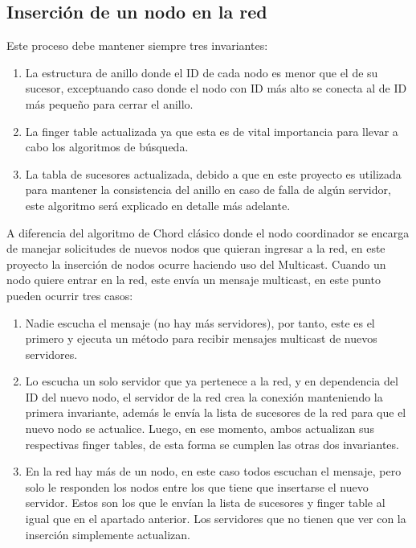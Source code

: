 \documentclass[10pt, a4paper]{article}
\begin{document}
    \subsection{Inserci\'on de un nodo en la red}
    Este proceso debe mantener siempre tres invariantes:
    \begin{enumerate}
    	\item La estructura de anillo donde el ID de cada nodo es menor que el de su sucesor, exceptuando caso donde el nodo con ID más alto se conecta al de ID más pequeño para cerrar el anillo.
    	\item La finger table actualizada ya que esta es de vital importancia para llevar a cabo los algoritmos de búsqueda.
    	\item La tabla de sucesores actualizada, debido a que en este proyecto es utilizada para mantener la consistencia del anillo en caso de falla de algún servidor, este algoritmo será explicado en detalle más adelante.\\
    \end{enumerate}
    A diferencia del algoritmo de Chord clásico donde el nodo coordinador se encarga de manejar solicitudes de nuevos nodos que quieran ingresar a la red, en este proyecto la inserción de nodos ocurre haciendo uso del Multicast. Cuando un nodo quiere entrar en la red, este envía un mensaje multicast, en este punto pueden ocurrir tres casos:
    \begin{enumerate}
    	\item Nadie escucha el mensaje (no hay más servidores), por tanto, este es el primero y ejecuta un método para recibir mensajes multicast de nuevos servidores.
    	\item Lo escucha un solo servidor que ya pertenece a la red, y en dependencia del ID del nuevo nodo, el servidor de la red crea la conexión manteniendo la primera invariante, además le envía la lista de sucesores de la red para que el nuevo nodo se actualice. Luego, en ese momento, ambos actualizan sus respectivas finger tables, de esta forma se cumplen las otras dos invariantes.
    	\item En la red hay más de un nodo, en este caso todos escuchan el mensaje, pero solo le responden los nodos entre los que tiene que insertarse el nuevo servidor. Estos son los que le envían la lista de sucesores y finger table al igual que en el apartado anterior. Los servidores que no tienen que ver con la inserción simplemente actualizan.\\
    \end{enumerate}
    
\end{document}
